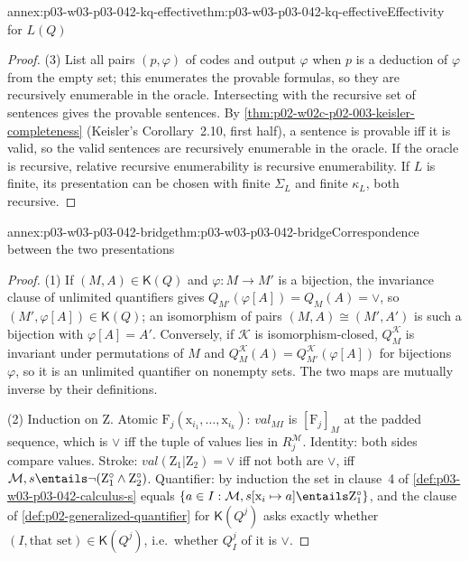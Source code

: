 \begin{annexitem}{annex:p03-w03-p03-042-kq-effective}{thm:p03-w03-p03-042-kq-effective}{Effectivity for \(L(Q)\)}
\begin{proof}
(3) List all pairs \((p,\varphi)\) of codes and output \(\varphi\) when
\(p\) is a deduction of \(\varphi\) from the empty set; this enumerates the
provable formulas, so they are recursively enumerable in the oracle.
Intersecting with the recursive set of sentences gives the provable
sentences.  By \cref{thm:p02-w02c-p02-003-keisler-completeness} (Keisler's
Corollary~2.10, first half), a sentence is provable iff it is valid, so
the valid sentences are recursively enumerable in the oracle.  If the
oracle is recursive, relative recursive enumerability is recursive
enumerability.  If \(L\) is finite, its presentation can be chosen with
finite \(\Sigma_L\) and finite \(\kappa_L\), both recursive.
\end{proof}
\end{annexitem}

\begin{annexitem}{annex:p03-w03-p03-042-bridge}{thm:p03-w03-p03-042-bridge}{Correspondence between the two presentations}
\begin{proof}
(1) If \((M,A)\in\mathsf K(Q)\) and \(\varphi:M\to M'\) is a bijection,
the invariance clause of unlimited quantifiers gives
\(Q_{M'}(\varphi[A])=Q_M(A)=\vee\), so \((M',\varphi[A])\in\mathsf K(Q)\);
an isomorphism of pairs \((M,A)\cong(M',A')\) is such a bijection with
\(\varphi[A]=A'\).  Conversely, if \(\mathcal K\) is isomorphism-closed,
\(Q^{\mathcal K}_M\) is invariant under permutations of \(M\) and
\(Q^{\mathcal K}_M(A)=Q^{\mathcal K}_{M'}(\varphi[A])\) for bijections
\(\varphi\), so it is an unlimited quantifier on nonempty sets.  The two
maps are mutually inverse by their definitions.

(2) Induction on \(\mathrm Z\).  Atomic \(\mathrm F_j(\mathrm x_{i_1},
\ldots,\mathrm x_{i_k})\): \(\mathit{val}_{MI}\) is
\([\mathrm F_j]_M\) at the padded sequence, which is \(\vee\) iff the tuple
of values lies in \(R_j^{\mathcal M}\).  Identity: both sides compare
values.  Stroke: \(\mathit{val}(\mathrm Z_1|\mathrm Z_2)=\vee\) iff not
both are \(\vee\), iff \(\mathcal M,s\entails\neg(\mathrm Z_1^\circ\land
\mathrm Z_2^\circ)\).  Quantifier: by induction the set in clause~4 of
\cref{def:p03-w03-p03-042-calculus-s} equals \(\{a\in I:\mathcal
M,s[\mathrm x_i\mapsto a]\entails\mathrm Z_1^\circ\}\), and the clause of
\cref{def:p02-generalized-quantifier} for \(\mathsf K(Q^j)\) asks exactly
whether \((I,\text{that set})\in\mathsf K(Q^j)\), i.e.\ whether
\(Q^j_I\) of it is \(\vee\).


\end{proof}
\end{annexitem}
